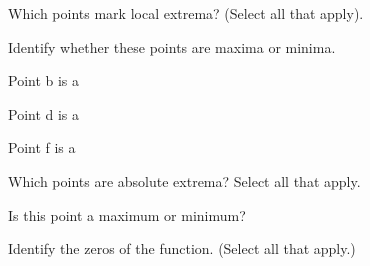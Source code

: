 \documentclass{ximera}
\begin{document}
\begin{problem}
    Which points mark local extrema? (Select all that apply).
    \begin{selectAll}
    \end{selectAll}
    \begin{problem}
        Identify whether these points are maxima or minima.

        Point b is a
        \begin{multipleChoice}
        \end{multipleChoice}

        Point d is a
        \begin{multipleChoice}
        \end{multipleChoice}

        Point f is a
        \begin{multipleChoice}
        \end{multipleChoice}
    \end{problem}
\end{problem}

\begin{problem}
    Which points are absolute extrema? Select all that apply.
        \begin{selectAll}
        \end{selectAll}
    \begin{problem}
        Is this point a maximum or minimum?
        \begin{multipleChoice}
        \end{multipleChoice}
    \end{problem}
\end{problem}

\begin{problem}
    Identify the zeros of the function. (Select all that apply.)
    \begin{selectAll}
    \end{selectAll}
\end{problem}
\end{document}
